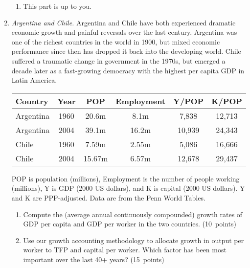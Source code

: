 \documentclass[letterpaper,12pt]{article}
\begin{document}
\begin{enumerate}
\begin{enumerate}
\item This part is up to you.  


\end{enumerate}


\item {\it Argentina and Chile. } 
Argentina and Chile have both experienced dramatic economic growth
and painful reversals over the last century.  
Argentina was one of the richest countries in the world in 1900, 
but mixed economic performance since then has 
dropped it back into the developing world.  
Chile suffered a traumatic change in government in the 1970s, 
but emerged a decade later as a fast-growing democracy with 
the highest per capita GDP in Latin America.  
\begin{center}
\begin{tabular}{lccccc}
\hline\hline
Country   &  Year   &  POP   &  Employment &  Y/POP &  K/POP  \\
\hline\hline
Argentina \hspace*{0.1in} &  1960   &  20.6m &  \phantom{1}8.1m   
                &  \phantom{1}7,838  &  12,713  \\
Argentina &  2004   &  39.1m &  16.2m             &  10,939 &  24,343  \\
Chile   &  1960  & 7.59m &  2.55m   
                &  \phantom{1}5,086   &   16,666  \\
Chile     &  2004   & 15.67m\phantom{1} &  6.57m   &  12,678  &  29,437  \\
\hline\hline
\end{tabular}
\end{center}
POP is population (millions), Employment is the number of people working 
(millions), Y is GDP (2000 US dollars), 
and K is capital (2000 US dollars).  
Y and K are PPP-adjusted.  
Data are from the Penn World Tables.  


\begin{enumerate}
\item Compute the (average annual continuously compounded) 
growth rates of GDP per capita and GDP per worker in the two countries.  (10~points)

\item Use our growth accounting methodology to allocate growth in
output per worker to TFP and capital per worker.
Which factor has been most important over the last 40+ years? (15~points)


\end{enumerate}
\end{enumerate}
\end{document}
